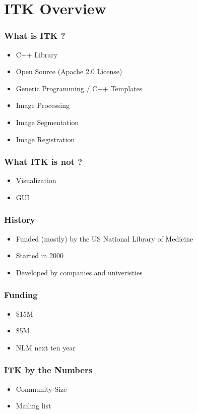 \section{ITK Overview}



\begin{frame}
\frametitle{What is ITK ?}
\begin{itemize}
\item C++ Library
\pause
\item Open Source (Apache 2.0 License)
\pause
\item Generic Programming / C++ Templates
\pause
\item Image Processing
\pause
\item Image Segmentation
\pause
\item Image Registration
\end{itemize}
\end{frame}


\begin{frame}
\frametitle{What ITK is not ?}
\begin{itemize}
\item Visualization
\pause
\item GUI
\end{itemize}
\end{frame}


\begin{frame}
\frametitle{History}
\begin{itemize}
\item Funded (mostly) by the US National Library of Medicine
\pause
\item Started in 2000
\pause
\item Developed by companies and univeristies
\end{itemize}
\end{frame}


\begin{frame}
\frametitle{Funding}
\begin{itemize}
\item \$15M
\pause
\item \$5M
\pause
\item NLM next ten year
\end{itemize}
\end{frame}


\begin{frame}
\frametitle{ITK by the Numbers}
\begin{itemize}
\item Community Size
\pause
\item Mailing list
\end{itemize}
\end{frame}


